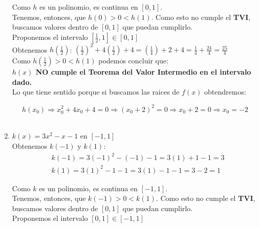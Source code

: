\documentclass[12pt]{article}
\begin{document}
\begin{enumerate}[\hspace{9px} a)]
        Como $h$ es un polinomio, es continua en $[0,1]$.\\

        Tenemos, entonces, que \(h(0) > 0 < h(1)\). Como esto no cumple el \textbf{TVI}, buscamos valores dentro de $[0,1]$ que puedan cumplirlo.\\

        Proponemos el intervalo $\left[\frac{1}{2},1\right] \in [0,1]$\\

        Obtenemos \(h\left(\displaystyle\frac{1}{2}\right)\): \quad \(\left(\displaystyle\frac{1}{2}\right)^2+4\left(\displaystyle\frac{1}{2}\right)+4 = \left(\displaystyle\frac{1}{4}\right)+2+4 = \displaystyle\frac{1}{4}+\displaystyle\frac{24}{4}=\displaystyle\frac{25}{4}\)
        \\

        Como \(h\left(\displaystyle\frac{1}{2}\right) > 0 < h(1)\) podemos concluir que:\\

        \textbf{$h(x)$ NO cumple el Teorema del Valor Intermedio en el intervalo dado.}\\

        Lo que tiene sentido porque si buscamos las raices de $f(x)$ obtendremos:

        \begin{equation*}
            h(x_0) \Rightarrow x_0^2+4x_0+4=0 \Rightarrow (x_0+2)^2=0 \Rightarrow x_0+2=0 \Rightarrow x_0=-2
        \end{equation*}\\

    \item \(k(x)=3x^2-x-1\) en $[-1,1]$\\

        Obtenemos $k(-1)$ y $k(1)$:
        \begin{align*}
            &k(-1)=3(-1)^2-(-1)-1=3(1)+1-1=3 \\
            &k(1)=3(1)^2-1-1=3(1)-1-1=3-2=1
        \end{align*}

        Como $k$ es un polinomio, es continua en $[-1,1]$.\\

        Tenemos, entonces, que \(k(-1) > 0 < k(1)\). Como esto no cumple el \textbf{TVI}, buscamos valores dentro de $[0,1]$ que puedan cumplirlo.\\

        Proponemos el intervalo $[0,1] \in [-1,1]$\\


\end{enumerate}
\end{document}
